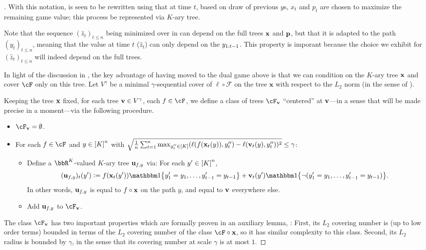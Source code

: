 \begin{proof}[]
With this notation,  is seen to be  rewritten using that at time $t$, based on draw of previous $y$s, $x_t$ and $p_t$ are chosen to maximize the remaining game value; this process be represented via $K$-ary tree.

Note that the sequence $(\hat{z}_{t})_{t\leq{}n}$ being minimized over in  can depend on the full trees $\x$ and $\p$, but that it is adapted to the path $(y_t)_{t\leq{}n}$, meaning that the value at time $t$ ($\hat{z}_{t}$) can only depend on the $\yr[t-1]$. This property is imporant because the choice we exhibit for $(\hat{z}_{t})_{t\leq{}n}$ will indeed depend on the full trees.

In light of the discussion in , the key advantage of having moved to the dual game above is that we can condition on the $K$-ary tree $\x$ and cover $\F$ only on this tree. Let $V^\gamma$ be a minimal $\gamma$-sequential cover of $\ell \circ \mathcal{F}$ on the tree $\mathbf{x}$ with respect to the $L_2$ norm (in the sense of ). 

Keeping the tree $\x$ fixed, for each tree $\vv \in V^\gamma$, each $f \in \F$, we define a class of trees $\cF_{\vv}$ ``centered'' at $\vv$---in a sense that will be made precise in a moment---via the following procedure.

\begin{itemize}[leftmargin=*]
\item $\cF_{\vv} = \emptyset$.
\item For each $f\in\cF$ and $y\in\brk*{K}^{n}$ with $\sqrt{\frac{1}{n} \sum_{t=1}^n \max_{y''_t\in\brk*{K}}(\ell(f(\x_t(y)),y''_t) - \ell(\vv_t(y),y''_t) )^2} \le \gamma$: 
\begin{itemize}
\item Define a $\bbR^{K}$-valued $K$-ary tree $\uu_{f,y}$ via: For each $y'\in\brk*{K}^{n}$, 
\[
(\uu_{f,y})_{t}(y') \ldef f(\x_{t}(y'))\ind\crl*{y'_1=y_1,\ldots,y'_{t-1}=y_{t-1}} + \vv_{t}(y')\ind\crl*{\neg{}(y'_1=y_1,\ldots,y'_{t-1}=y_{t-1})}.
\]
In other words, $\uu_{f,y}$ is equal to $f\circ\x$ on the path $y$, and equal to $\vv$ everywhere else.
\item Add $\uu_{f,y}$ to $\cF_{\vv}$.
\end{itemize}
\end{itemize}

The class $\cF_{\vv}$ has two important properties which are formally proven in an auxiliary lemma, : First, its $L_2$ covering number is (up to low order terms) bounded in terms of the $L_2$ covering number of the class $\cF\circ{}\x$, so it has similar complexity to this class. Second, its $L_2$ radius is bounded by $\gamma$, in the sense that its covering number at scale $\gamma$ is at most $1$.


\end{proof}
